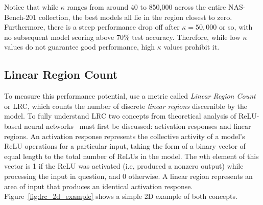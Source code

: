 Notice that while $\kappa$ ranges from around 40 to 850,000 across the entire NAS-Bench-201 collection, the best
models all lie in the region closest to zero. Furthermore, there is a steep performance drop off after $\kappa=50,000$
or so, with no subsequent model scoring above 70\% test accuracy. Therefore, while low $\kappa$ values do not guarantee
good performance, high $\kappa$ values prohibit it.

\subsection{Linear Region Count}
To measure this performance potential, \citeauthor{chen2021} use a metric
called \textit{Linear Region Count} or LRC, which counts the number of discrete \textit{linear regions} discernible by the model.
To fully understand LRC two concepts from theoretical analysis of ReLU-based neural networks~\citep{pascanu2013}
must first be discussed: activation responses and linear regions. An activation response represents the collective
activity of a model's ReLU operations for a particular input, taking the form of a binary vector of equal length to the
total number of ReLUs in the model. The $n$th element of this vector is 1 if the ReLU was activated (i.e, produced a nonzero output)
while processing the input in question, and 0 otherwise. A linear region represents an area of input that
produces an identical activation response. Figure~\ref{fig:lrc_2d_example} shows a simple 2D example of both concepts.
